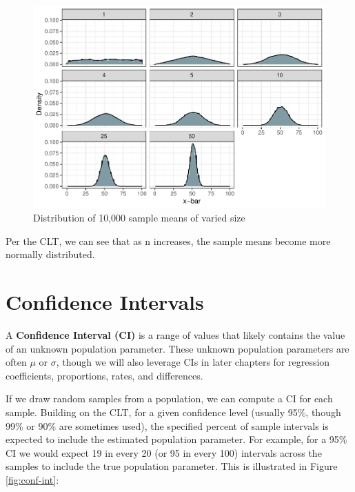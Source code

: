 \documentclass[
]{book}
\begin{document}
\begin{figure}

{\centering \includegraphics{The_Fundamentals_of_People_Analytics_files/figure-latex/unnamed-chunk-128-1} 

}

\caption{Distribution of 10,000 sample means of varied size}\label{fig:unnamed-chunk-128}
\end{figure}

Per the CLT, we can see that as n increases, the sample means become more normally distributed.

\hypertarget{confidence-intervals}{%
\section{Confidence Intervals}\label{confidence-intervals}}

A \textbf{Confidence Interval (CI)} is a range of values that likely contains the value of an unknown population parameter. These unknown population parameters are often \(\mu\) or \(\sigma\), though we will also leverage CIs in later chapters for regression coefficients, proportions, rates, and differences.

If we draw random samples from a population, we can compute a CI for each sample. Building on the CLT, for a given confidence level (usually 95\%, though 99\% or 90\% are sometimes used), the specified percent of sample intervals is expected to include the estimated population parameter. For example, for a 95\% CI we would expect 19 in every 20 (or 95 in every 100) intervals across the samples to include the true population parameter. This is illustrated in Figure \ref{fig:conf-int}:
\end{document}
